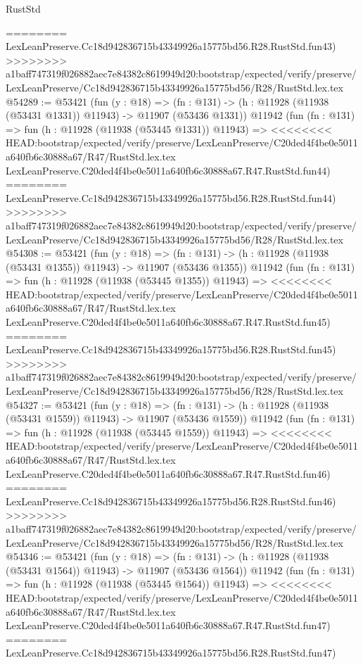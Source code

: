 \begin{lexlean}{RustStd}
\begin{coremodule}
{\begin{coremodule}
{{{{{{{{{{{{{{{{{{{{{{{{{{{{{{{{{{{{{{{{{{{{{{{{{{{{{{{{{{{{{{{{{{{{{{{{{{{{{{{{========
    LexLeanPreserve.Cc18d942836715b43349926a15775bd56.R28.RustStd.fun43)
>>>>>>>> a1baff747319f026882aec7e84382c8619949d20:bootstrap/expected/verify/preserve/LexLeanPreserve/Cc18d942836715b43349926a15775bd56/R28/RustStd.lex.tex
@54289 := @53421
    (fun (y : @18) =>
    (fn : @131) -> (h : @11928 (@11938 (@53431 @1331)) @11943) -> @11907 (@53436 @1331))
    @11942
    (fun (fn : @131) =>
    fun (h : @11928 (@11938 (@53445 @1331)) @11943) =>
<<<<<<<< HEAD:bootstrap/expected/verify/preserve/LexLeanPreserve/C20ded4f4be0e5011a640fb6c30888a67/R47/RustStd.lex.tex
    LexLeanPreserve.C20ded4f4be0e5011a640fb6c30888a67.R47.RustStd.fun44)
========
    LexLeanPreserve.Cc18d942836715b43349926a15775bd56.R28.RustStd.fun44)
>>>>>>>> a1baff747319f026882aec7e84382c8619949d20:bootstrap/expected/verify/preserve/LexLeanPreserve/Cc18d942836715b43349926a15775bd56/R28/RustStd.lex.tex
@54308 := @53421
    (fun (y : @18) =>
    (fn : @131) -> (h : @11928 (@11938 (@53431 @1355)) @11943) -> @11907 (@53436 @1355))
    @11942
    (fun (fn : @131) =>
    fun (h : @11928 (@11938 (@53445 @1355)) @11943) =>
<<<<<<<< HEAD:bootstrap/expected/verify/preserve/LexLeanPreserve/C20ded4f4be0e5011a640fb6c30888a67/R47/RustStd.lex.tex
    LexLeanPreserve.C20ded4f4be0e5011a640fb6c30888a67.R47.RustStd.fun45)
========
    LexLeanPreserve.Cc18d942836715b43349926a15775bd56.R28.RustStd.fun45)
>>>>>>>> a1baff747319f026882aec7e84382c8619949d20:bootstrap/expected/verify/preserve/LexLeanPreserve/Cc18d942836715b43349926a15775bd56/R28/RustStd.lex.tex
@54327 := @53421
    (fun (y : @18) =>
    (fn : @131) -> (h : @11928 (@11938 (@53431 @1559)) @11943) -> @11907 (@53436 @1559))
    @11942
    (fun (fn : @131) =>
    fun (h : @11928 (@11938 (@53445 @1559)) @11943) =>
<<<<<<<< HEAD:bootstrap/expected/verify/preserve/LexLeanPreserve/C20ded4f4be0e5011a640fb6c30888a67/R47/RustStd.lex.tex
    LexLeanPreserve.C20ded4f4be0e5011a640fb6c30888a67.R47.RustStd.fun46)
========
    LexLeanPreserve.Cc18d942836715b43349926a15775bd56.R28.RustStd.fun46)
>>>>>>>> a1baff747319f026882aec7e84382c8619949d20:bootstrap/expected/verify/preserve/LexLeanPreserve/Cc18d942836715b43349926a15775bd56/R28/RustStd.lex.tex
@54346 := @53421
    (fun (y : @18) =>
    (fn : @131) -> (h : @11928 (@11938 (@53431 @1564)) @11943) -> @11907 (@53436 @1564))
    @11942
    (fun (fn : @131) =>
    fun (h : @11928 (@11938 (@53445 @1564)) @11943) =>
<<<<<<<< HEAD:bootstrap/expected/verify/preserve/LexLeanPreserve/C20ded4f4be0e5011a640fb6c30888a67/R47/RustStd.lex.tex
    LexLeanPreserve.C20ded4f4be0e5011a640fb6c30888a67.R47.RustStd.fun47)
========
    LexLeanPreserve.Cc18d942836715b43349926a15775bd56.R28.RustStd.fun47)
}}}}}}}}}}}}}}}}}}}}}}}}}}}}}}}}}}}}}}}}}}}}}}}}}}}}}}}}}}}}}}}}}}}}}}}}}}}}}}}}
\end{coremodule}}
\end{coremodule}
\end{lexlean}
